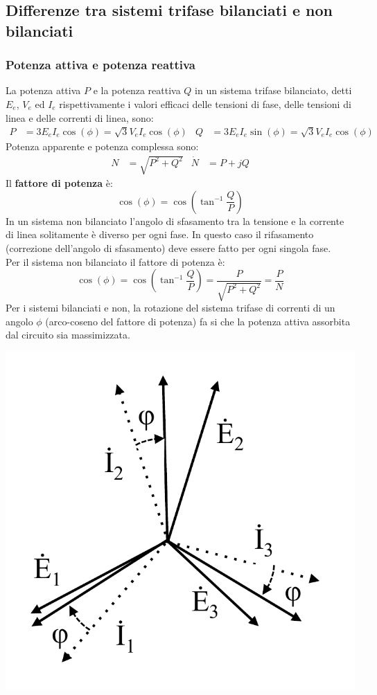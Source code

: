 \documentclass{article}
\begin{document}
\subsection{Differenze tra sistemi trifase bilanciati e non bilanciati}
\subsubsection{Potenza attiva e potenza reattiva}
La potenza attiva $P$ e la potenza reattiva $Q$ in un sistema trifase bilanciato,
detti $E_e$, $V_e$ ed $I_e$ rispettivamente i valori efficaci delle tensioni di fase, delle
tensioni di linea e delle correnti di linea, sono:
\begin{align*}
    P &= 3E_eI_e \cos(\phi) = \sqrt{3}V_eI_e \cos(\phi)
    &
    Q &= 3E_eI_e \sin(\phi) = \sqrt{3}V_eI_e \cos(\phi)
\end{align*}
Potenza apparente e potenza complessa sono:
\begin{align*}
    N &= \sqrt{P^2+Q^2} & \dot N &= P + jQ
\end{align*}
Il \textbf{fattore di potenza} è:
\[
    \cos(\phi) = \cos \left(\tan^{-1} \frac{Q}{P}\right)
\]
In un sistema non bilanciato l'angolo di sfasamento tra la tensione e la corrente di linea solitamente è diverso per ogni fase. In questo caso il rifasamento (correzione dell'angolo di sfasamento) deve essere fatto per ogni singola fase.\\
Per il sistema non bilanciato il fattore di potenza è:
\[
    \cos(\phi) = \cos \left(\tan^{-1} \frac{Q}{P}\right) = \frac{P}{\sqrt{P^2+Q^2}} = \frac{P}{N}
\]
Per i sistemi bilanciati e non, la rotazione del sistema trifase di correnti di un angolo $\phi$ (arco-coseno del fattore di potenza) fa si che la potenza attiva assorbita dal circuito sia massimizzata.
\begin{center}
    \includegraphics[scale=0.27]{Image/Potenza_sistemi_trifase_non_bilanciati_1.png}
\end{center}
\end{document}
